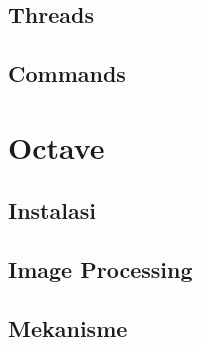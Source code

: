 \documentclass[11pt,fleqn]{book} %
\begin{document}
\section{Threads}

\section{Commands}

\newpage
{} %
\chapter{Octave}
\section{Instalasi}
\section{Image Processing}
\section{Mekanisme}
\end{document}
